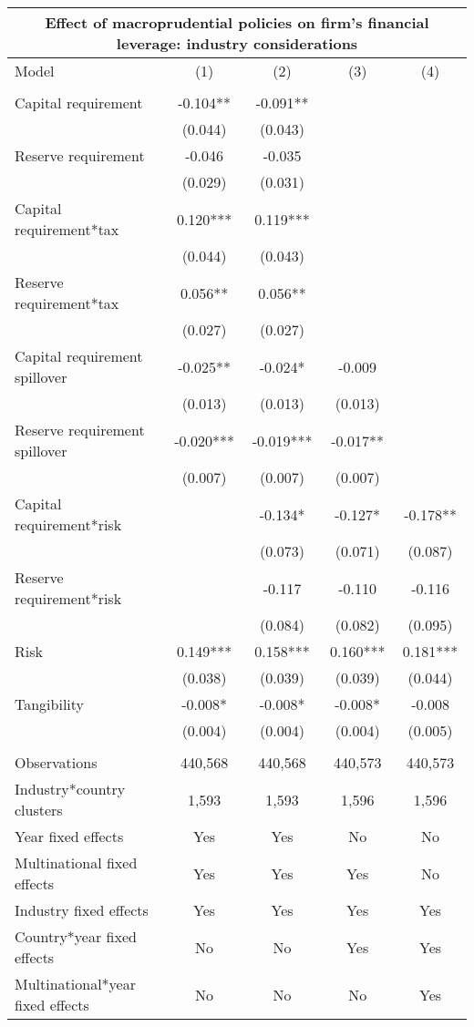 \begin{tabular}{lcccc}
\multicolumn{5}{c}{Effect of macroprudential policies on firm's financial leverage: industry considerations} \\ \hline
Model & (1) & (2) & (3) & (4) \\ \hline
 &  &  &  &  \\
Capital requirement & -0.104** & -0.091** &  &  \\
 & (0.044) & (0.043) &  &  \\
Reserve requirement & -0.046 & -0.035 &  &  \\
 & (0.029) & (0.031) &  &  \\
Capital requirement*tax & 0.120*** & 0.119*** &  &  \\
 & (0.044) & (0.043) &  &  \\
Reserve requirement*tax & 0.056** & 0.056** &  &  \\
 & (0.027) & (0.027) &  &  \\
Capital requirement spillover & -0.025** & -0.024* & -0.009 &  \\
 & (0.013) & (0.013) & (0.013) &  \\
Reserve requirement spillover & -0.020*** & -0.019*** & -0.017** &  \\
 & (0.007) & (0.007) & (0.007) &  \\
Capital requirement*risk &  & -0.134* & -0.127* & -0.178** \\
 &  & (0.073) & (0.071) & (0.087) \\
Reserve requirement*risk &  & -0.117 & -0.110 & -0.116 \\
 &  & (0.084) & (0.082) & (0.095) \\
Risk & 0.149*** & 0.158*** & 0.160*** & 0.181*** \\
 & (0.038) & (0.039) & (0.039) & (0.044) \\
Tangibility & -0.008* & -0.008* & -0.008* & -0.008 \\
 & (0.004) & (0.004) & (0.004) & (0.005) \\

 &  &  &  &  \\
Observations & 440,568 & 440,568 & 440,573 & 440,573 \\
Industry*country clusters & 1,593 & 1,593 & 1,596 & 1,596 \\
Year fixed effects & Yes & Yes & No & No \\
Multinational fixed effects & Yes & Yes & Yes & No \\
Industry fixed effects & Yes & Yes & Yes & Yes \\
Country*year fixed effects & No & No & Yes & Yes \\
 Multinational*year fixed effects & No & No & No & Yes \\ \hline
\end{tabular}

